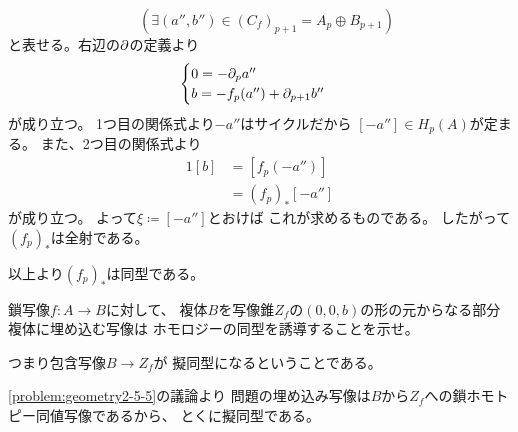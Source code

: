 \documentclass[report]{jlreq}
\begin{document}
\begin{answer}
\begin{innerproof}
\begin{equation}
                \quad (\exists (a'', b'') \in (C_f)_{p + 1} = A_{p} \oplus B_{p + 1})
        \end{equation}
        と表せる。右辺の$\partial$の定義より
        \begin{equation}
            \begin{cases}
                0 = - \partial_{p} a'' \\
                b = - f_{p}(a'') + \partial_{p + 1} b''
            \end{cases}
        \end{equation}
        が成り立つ。
        1つ目の関係式より$- a''$はサイクルだから
        $[- a''] \in H_p(A)$が定まる。
        また、2つ目の関係式より
        \begin{alignat}{1}
            [b]
                &= [f_{p}(- a'')] \\
                &= (f_p)_* [- a'']
        \end{alignat}
        が成り立つ。
        よって$\xi \coloneqq [- a'']$とおけば
        これが求めるものである。
        したがって$(f_p)_*$は全射である。
    \end{innerproof}
    以上より$(f_p)_*$は同型である。
\end{answer}

\begin{problem}
    鎖写像$f \colon A \to B$に対して、
    複体$B$を写像錐$Z_f$の$(0, 0, b)$の形の元からなる部分複体に埋め込む写像は
    ホモロジーの同型を誘導することを示せ。
\end{problem}

\begin{remark}
    つまり包含写像$B \to Z_f$が
    擬同型になるということである。
\end{remark}

\begin{answer}[解法 1.]
    \cref{problem:geometry2-5-5}の議論より
    問題の埋め込み写像は$B$から$Z_f$への鎖ホモトピー同値写像であるから、
    とくに擬同型である。
\end{answer}
\end{document}
